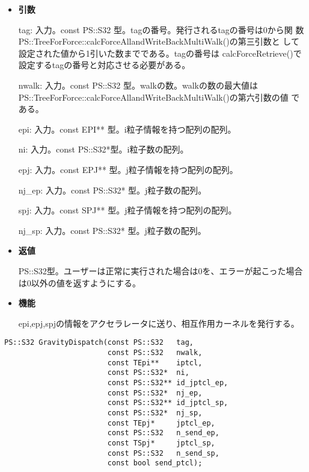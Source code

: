 \begin{itemize}

\item {\bf 引数}

  tag: 入力。const PS::S32 型。tagの番号。発行されるtagの番号は0から関
  数PS::TreeForForce::calcForceAllandWriteBackMultiWalk()の第三引数と
  して設定された値から1引いた数までである。tagの番号は
  calcForceRetrieve()で設定するtagの番号と対応させる必要がある。

  nwalk: 入力。const PS::S32 型。walkの数。walkの数の最大値は
  PS::TreeForForce::calcForceAllandWriteBackMultiWalk()の第六引数の値
  である。

  epi: 入力。const EPI** 型。i粒子情報を持つ配列の配列。

  ni: 入力。const PS::S32*型。i粒子数の配列。

  epj: 入力。const EPJ** 型。j粒子情報を持つ配列の配列。
  
  nj\_ep: 入力。const PS::S32* 型。j粒子数の配列。

  spj: 入力。const SPJ** 型。j粒子情報を持つ配列の配列。
  
  nj\_sp: 入力。const PS::S32* 型。j粒子数の配列。

\item {\bf 返値}

  PS::S32型。ユーザーは正常に実行された場合は0を、エラーが起こった場合
  は0以外の値を返すようにする。
  
\item {\bf 機能}

epi,epj,spjの情報をアクセラレータに送り、相互作用カーネルを発行する。
  
\end{itemize}

\begin{lstlisting}[caption=calcForceDispatch]
PS::S32 GravityDispatch(const PS::S32   tag,
                        const PS::S32   nwalk,
                        const TEpi**    iptcl,
                        const PS::S32*  ni,
                        const PS::S32** id_jptcl_ep,
                        const PS::S32*  nj_ep,
                        const PS::S32** id_jptcl_sp,
                        const PS::S32*  nj_sp,
                        const TEpj*     jptcl_ep,
                        const PS::S32   n_send_ep,
                        const TSpj*     jptcl_sp,
                        const PS::S32   n_send_sp,
                        const bool send_ptcl);
\end{lstlisting}

